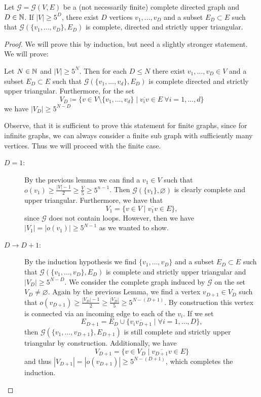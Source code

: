 \begin{lemma}[{\cite[Lemma~A.8]{MR3509968}}]
  \label{lem:A.8}
  Let \(\mathcal{G} = \mathcal{G}(V,E)\) be a (not necessarily finite) complete directed graph and \(D \in \mathbb{N}\). If \(|V| \geq 5^D\), there exist \(D\) vertices \(v_1, \dots, v_D\) and a subset \(E_D \subset E\) such that \(\mathcal{G}(\{v_1, \dots, v_D\}, E_D)\) is complete, directed and strictly upper triangular.
\end{lemma}

\begin{proof}
  We will prove this by induction, but need a slightly stronger statement. We will prove:

  Let \(N \in \mathbb{N}\) and \(|V| \geq 5^N\). Then for each \(D \leq N\) there exist \(v_1,\dots, v_D \in V\) and a subset \(E_D \subset E\) such that \(\mathcal{G}(\{v_1, \dots, v_d\}, E_D)\) is complete directed and strictly upper triangular. Furthermore, for the set
  \[
    V_D \coloneqq \{v \in V \setminus \{v_1, \dots, v_d\} \mid \overline{v_iv} \in E\ \forall i =1,\dots, d\}
  \]
  we have \(|V_D| \geq 5^{N-D}\)

  Observe, that it is sufficient to prove this statement for finite graphs, since for infinite graphs, we can always consider a finite sub graph with sufficiently many vertices. Thus we will proceed with the finite case.
  \begin{description}
  \item[\(D = 1\):] By the previous lemma we can find a \(v_1 \in V\) such that \(o(v_1) \geq \frac{|V| - 1}{2} \geq \frac{V}{5} \geq 5^{n-1}\). Then \(\mathcal{G}(\{v_1\}, \varnothing)\) is clearly complete and upper triangular. Furthermore, we have that
    \[
      V_1 = \{v \in V \mid \overline{v_1v} \in E\},
    \]
    since \(\mathcal{G}\) does not contain loops. However, then we have \(|V_1| = |o(v_1)| \geq 5^{N-1}\) as we wanted to show.
  \item[\(D \to D+1\):] By the induction hypothesis we find \(\{v_1, \dots, v_D\}\) and a subset \(E_D \subset E\) such that \(\mathcal{G}(\{v_1, \dots, v_D\}, E_D)\) is complete and strictly upper triangular and \(|V_D| \geq 5^{N-D}\). We consider the complete graph induced by \(\mathcal{G}\) on the set \(V_D \neq \varnothing\). Again by the previous Lemma, we find a vertex \(v_{D+1} \in V_D\) such that \(o(v_{D+1}) \geq \frac{|V_D| -1}{2} \geq \frac{|V_D|}{5} \geq 5^{N - (D+1)}\). By construction this vertex is connected via an incoming edge to each of the \(v_i\). If we set
    \[
      E_{D+1} = E_D \cup \{\overline{v_iv_{D+1}} \mid \forall i = 1, \dots, D\},
    \]
    then \(\mathcal{G}(\{v_1, \dots, v_{D+1}\}, E_{D+1})\) is still complete and strictly upper triangular by construction. Additionally, we have
    \[
      V_{D+1} = \{v \in V_D \mid \overline{v_{D+1}v} \in E\}
    \]
    and thus \(|V_{D+1}| = |o(v_{D+1})| \geq 5^{N- (D+1)}\), which completes the induction.
  \end{description}
\end{proof}

